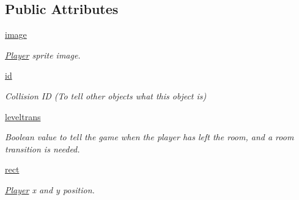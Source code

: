 \subsection*{Public Attributes}
\begin{DoxyCompactItemize}
\item 
\mbox{\label{classactor_1_1player_1_1_player_a3f083bf2ff3a0c9fd8838d1292eb6c24}} 
\hyperlink{classactor_1_1player_1_1_player_a3f083bf2ff3a0c9fd8838d1292eb6c24}{image}
\begin{DoxyCompactList}\small\item\em \hyperlink{classactor_1_1player_1_1_player}{Player} sprite image. \end{DoxyCompactList}\item 
\mbox{\label{classactor_1_1player_1_1_player_ae166fad5513e8a1afbf28b7090f84385}} 
\hyperlink{classactor_1_1player_1_1_player_ae166fad5513e8a1afbf28b7090f84385}{id}
\begin{DoxyCompactList}\small\item\em Collision ID (To tell other objects what this object is) \end{DoxyCompactList}\item 
\mbox{\label{classactor_1_1player_1_1_player_a80b827225d4cd1ece986735ed50ccaab}} 
\hyperlink{classactor_1_1player_1_1_player_a80b827225d4cd1ece986735ed50ccaab}{leveltrans}
\begin{DoxyCompactList}\small\item\em Boolean value to tell the game when the player has left the room, and a room transition is needed. \end{DoxyCompactList}\item 
\mbox{\label{classactor_1_1player_1_1_player_a17fb13fa8c9bb02af137a6f5e83d2620}} 
\hyperlink{classactor_1_1player_1_1_player_a17fb13fa8c9bb02af137a6f5e83d2620}{rect}
\begin{DoxyCompactList}\small\item\em \hyperlink{classactor_1_1player_1_1_player}{Player} x and y position. \end{DoxyCompactList}\item 
\mbox{\label{classactor_1_1player_1_1_player_a6a324fb53de6ee4b4bab31ea3fc0ffcf}} 

\end{DoxyCompactItemize}
